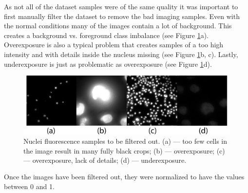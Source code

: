 As not all of the dataset samples were of the same quality it was important to first manually filter the dataset to remove the bad imaging samples. Even with the normal conditions many of the images contain a lot of background. This creates a background vs. foreground class imbalance (see Figure \ref{fig:bad-smaples}a). Overexposure is also a typical problem that creates samples of a too high intensity and with details inside the nucleus missing (see Figure \ref{fig:bad-smaples}b, c). Lastly, underexposure is just as problematic as overexposure (see Figure \ref{fig:bad-smaples}d).

\begin{figure}[H]
	\begin{center}
		\includegraphics[width=0.7\linewidth]{bilder/nuclei/filter-out.png}
		\caption[Nuclei fluorescence samples to be filtered out]%
		{Nuclei fluorescence samples to be filtered out. (a) --- too few cells in the image result in many fully black crops; (b) --- overexposure; (c) --- overexposure, lack of details; (d) --- underexposure.}\label{fig:bad-smaples}
	\end{center}
\end{figure}

Once the images have been filtered out, they were normalized to have the values between 0 and 1.
